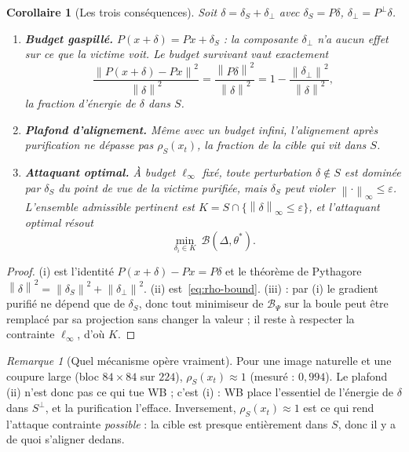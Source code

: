 \documentclass[11pt,a4paper]{article}
\theoremstyle{plain}
\newtheorem{corollary}[theorem]{Corollaire}
\theoremstyle{definition}
\theoremstyle{remark}
\newtheorem{remark}[theorem]{Remarque}
\newcommand{\B}{\mathcal{B}}
\newcommand{\norm}[1]{\left\lVert #1 \right\rVert}
\newcommand{\xt}{x_t}
\begin{document}
\begin{corollary}[Les trois conséquences]\label{cor:trois}
Soit $\delta=\delta_S+\delta_\perp$ avec $\delta_S=P\delta$, $\delta_\perp=P^\perp\delta$.
\begin{enumerate}[label=(\roman*)]
\item \textbf{Budget gaspillé.} $P(x+\delta)=Px+\delta_S$ : la composante $\delta_\perp$ n'a aucun
effet sur ce que la victime voit. Le \emph{budget survivant} vaut exactement
\[
\frac{\norm{P(x+\delta)-Px}^2}{\norm\delta^2}=\frac{\norm{P\delta}^2}{\norm\delta^2}=1-\frac{\norm{\delta_\perp}^2}{\norm\delta^2},
\]
la fraction d'énergie de $\delta$ dans $S$.
\item \textbf{Plafond d'alignement.} Même avec un budget infini, l'alignement après purification ne
dépasse pas $\rho_S(\xt)$, la fraction de la \emph{cible} qui vit dans $S$.
\item \textbf{Attaquant optimal.} À budget $\ell_\infty$ fixé, toute perturbation
$\delta\notin S$ est dominée par $\delta_S$ \emph{du point de vue de la victime purifiée}, mais
$\delta_S$ peut violer $\norm{\cdot}_\infty\le\varepsilon$. L'ensemble admissible pertinent est
$K=S\cap\{\norm\delta_\infty\le\varepsilon\}$, et l'attaquant optimal résout
\[
\min_{\delta_i\in K}\ \B(\Delta,\theta^*).
\]
\end{enumerate}
\end{corollary}
\begin{proof}
(i) est l'identité $P(x+\delta)-Px=P\delta$ et le théorème de Pythagore
$\norm\delta^2=\norm{\delta_S}^2+\norm{\delta_\perp}^2$. (ii) est~\eqref{eq:rho-bound}.
(iii) : par (i) le gradient purifié ne dépend que de $\delta_S$, donc tout minimiseur de $\B_\Psi$
sur la boule peut être remplacé par sa projection sans changer la valeur ; il reste à respecter la
contrainte $\ell_\infty$, d'où $K$.
\end{proof}

\begin{remark}[Quel mécanisme opère vraiment]\label{rem:lequel}
Pour une image naturelle et une coupure large (bloc $84\times84$ sur $224$), $\rho_S(\xt)\approx1$
(mesuré : $0{,}994$). Le plafond (ii) n'est donc pas ce qui tue WB ; c'est (i) : WB place
l'essentiel de l'énergie de $\delta$ dans $S^\perp$, et la purification l'efface. Inversement,
$\rho_S(\xt)\approx1$ est ce qui rend l'attaque contrainte \emph{possible} : la cible est presque
entièrement dans $S$, donc il y a de quoi s'aligner dedans.
\end{remark}
\end{document}
